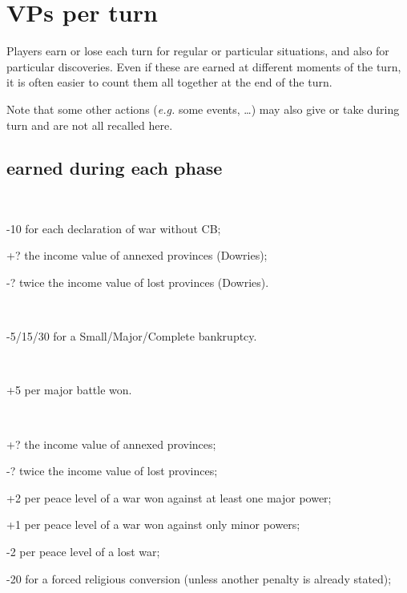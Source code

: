 \section{VPs per turn}\label{chVictories:Turn VP}
\aparag Players earn or lose \VPs each turn for regular or particular
situations, and also for particular discoveries.
\bparag Even if these \VPs are earned at different moments of the turn, it is
often easier to count them all together at the end of the turn.

\aparag Note that some other actions (\emph{e.g.} some events, \ldots) may
also give or take \VPs during turn and are not all recalled here.

\subsection{\VPs earned during each phase}
~\\
\begin{modlist}
\item[-10] for each declaration of war without CB;
\item[+?] the income value of annexed provinces (Dowries);
\item[-?] twice the income value of lost provinces (Dowries).
\end{modlist}

~\\
\begin{modlist}
\item[-5/15/30] for a Small/Major/Complete bankruptcy.
\end{modlist}

~\\
\begin{modlist}
\item[+5] per major battle won.
\end{modlist}

~\\
\begin{modlist}
\item[+?] the income value of annexed provinces;
\item[-?] twice the income value of lost provinces;
\item[+2] per peace level of a war won against at least one major power;
\item[+1] per peace level of a war won against only minor powers;
\item[-2] per peace level of a lost war;
\item[-20] for a forced religious conversion (unless another \VPs
  penalty is already stated);
\end{modlist}

